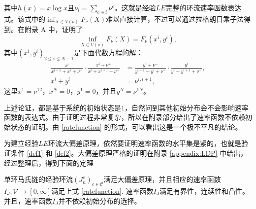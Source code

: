 其中$h(x) = x \log x$且$\nu_i=\sum_{c\ni i}\nu^c$。这就是经验$LE$完整的环流速率函数表达式。该式中的$\inf_{X\in V(\nu)}F_{\nu}(X)$难以直接计算，不过可以通过拉格朗日乘子法得到。在附录 A 中，证明了
\begin{equation*}
    \inf_{X\in V(\nu)}F_{\nu}(X) = F_{\nu}(x^i,y^i),
\end{equation*}
其中$(x^i,y^i)_{2\leq i\leq N-1}$是下面代数方程的解：
\begin{equation}\label{equation}
    \begin{split}
    \frac{x^{i}}{x^{i-1}+x^{i}+\nu^+}\cdot\frac{x^{i}+\nu^+}{x^{i}+x^{i+1}+\nu^+}
    &= \frac{y^{i}+\nu^-}{y^{i-1}+y^{i}+\nu^-}\cdot\frac{y^{i}}{y^{i}+y^{i+1}+\nu^-},\\
    x^{i} + y^{i} &= \nu^{i,i+1},
    \end{split}
\end{equation}
这里$x^1=\nu^{12}$，$x^N=0$，$y^1=0$，并且$y^N=\nu^{1N}$。

上述论证，都是基于系统的初始状态是$1$，自然问到其他初始分布会不会影响速率函数的表达式。由于证明过程非常复杂，所以在附录部分给出了速率函数不依赖初始状态的证明。由 \eqref{ratefunction} 的形式，可以看出这是一个极不平凡的结论。

为建立经验$LE$环流大偏差原理，依然要证明速率函数的水平集是紧的，也就是验证条件 \eqref{def1} 和 \eqref{def2}。大偏差原理严格的证明在附录 \ref{appendix:LDP} 中给出，经过整理后，得到下面的定理

\begin{theorem}\label{thm:LDP}
    单环马氏链的经验环流$(J^c_n)_{c\in\mathcal{C}}$满足大偏差原理，并且相应的速率函数$I_J:\mathcal{V}\to [0,\infty]$满足上式 \eqref{ratefunction}. 速率函数$I_J$满足有界性，连续性和凸性。并且，速率函数$I_J$并不依赖初始分布的选择。
\end{theorem}

